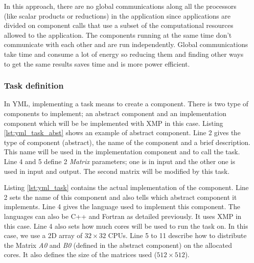 \begin{figure}[t]

\end{figure}

In this approach, there are no global communications along all the processors (like scalar products or reductions) in the application since applications are divided on component calls that use a subset of the computational resources allowed to the application.
The components running at the same time don't communicate with each other and are run independently.
Global communications take time and consume a lot of energy so reducing them and finding other ways to get the same results saves time and is more power efficient.

\begin{figure}

\end{figure}

\subsubsection{Task definition}
In YML, implementing a task means to create a component.
There is two type of components to implement; an abstract component and an implementation component which will be be implemented with XMP in this case.
Listing \ref{lst:yml_task_abst} shows an example of abstract component.
Line 2 gives the type of component (abstract), the name of the component and a brief description.
This name will be used in the implementation component and to call the task.
Line 4 and 5 define 2 \textit{Matrix} parameters; one is in input and the other one is used in input and output.
The second matrix will be modified by this task.

Listing \ref{lst:yml_task} contains the actual implementation of the component.
Line 2 sets the name of this component and also tells which abstract component it implements.
Line 4 gives the language used to implement this component.
The languages can also be C++ and Fortran as detailed previously.
It uses XMP in this case.
Line 4 also sets how much cores will be used to run the task on.
In this case, we use a 2D array of $32 \times 32$ CPUs.
Line 5 to 11 describe how to distribute the Matrix \textit{A0} and \textit{B0} (defined in the abstract component) on the allocated cores.
It also defines the size of the matrices used ($512 \times 512$).

